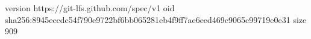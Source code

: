 version https://git-lfs.github.com/spec/v1
oid sha256:8945eccdc54f790e9722bf6bb065281eb4f9ff7ae6eed469c9065c99719e0e31
size 909
